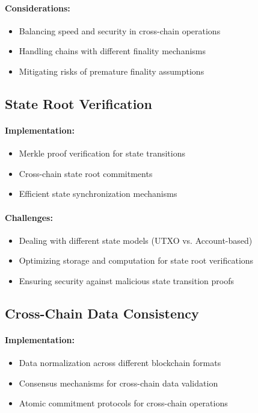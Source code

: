\documentclass[12pt,a4paper]{article}
\begin{document}
	\paragraph{Considerations:}
	\begin{itemize}
		\item Balancing speed and security in cross-chain operations
		\item Handling chains with different finality mechanisms
		\item Mitigating risks of premature finality assumptions
	\end{itemize}
	
	\subsection{State Root Verification}
	\paragraph{Implementation:}
	\begin{itemize}
		\item Merkle proof verification for state transitions
		\item Cross-chain state root commitments
		\item Efficient state synchronization mechanisms
	\end{itemize}
	
	\paragraph{Challenges:}
	\begin{itemize}
		\item Dealing with different state models (UTXO vs. Account-based)
		\item Optimizing storage and computation for state root verifications
		\item Ensuring security against malicious state transition proofs
	\end{itemize}
	
	\subsection{Cross-Chain Data Consistency}
	\paragraph{Implementation:}
	\begin{itemize}
		\item Data normalization across different blockchain formats
		\item Consensus mechanisms for cross-chain data validation
		\item Atomic commitment protocols for cross-chain operations
	\end{itemize}
	
\end{document}
